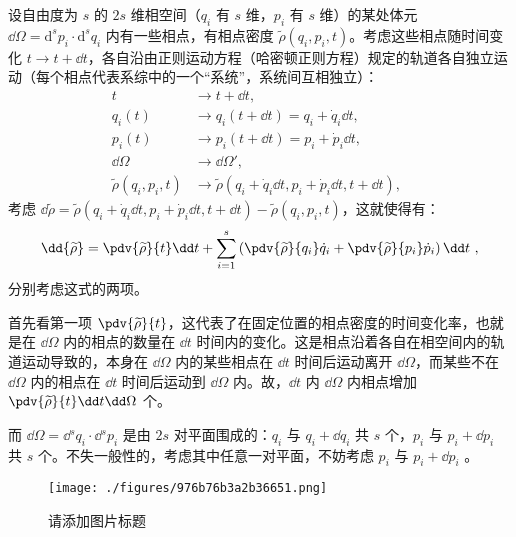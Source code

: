 设自由度为 $s$ 的 $2s$ 维相空间（$q_i$ 有 $s$ 维，$p_i$ 有 $s$ 维）的某处体元 $\dd \Omega = \mathrm{d}^{s}{p_i} \cdot  \mathrm{d}^{s}{q_i}$ 内有一些相点，有相点密度 $\widetilde \rho(q_i, p_i, t)$。考虑这些相点随时间变化 $t \rightarrow t + \dd t$，各自沿由正则运动方程（哈密顿正则方程）规定的轨道各自独立运动（每个相点代表系综中的一个“系统”，系统间互相独立）：
$$
\begin{aligned}
t                            &\rightarrow t+\dd t, \\
q_i(t)                       &\rightarrow q_i(t+\dd t) = q_i + \dot q_i \dd t, \\
p_i(t)                       &\rightarrow p_i(t+\dd t) = p_i + \dot p_i \dd t, \\
\dd \Omega                   &\rightarrow \dd \Omega', \\
\widetilde \rho(q_i, p_i, t) &\rightarrow \widetilde \rho(q_i + \dot q_i \dd t, p_i + \dot p_i \dd t, t + \dd t),
\end{aligned}~~
$$
考虑 $\dd{\widetilde{\rho}} = \widetilde{\rho}(q_i + \dot q_i \dd t, p_i + \dot p_i \dd t, t + \dd t) - \widetilde{\rho}(q_i, p_i, t)$，这就使得有：
\begin{equation}
\dd{\widetilde \rho} = \pdv{\widetilde \rho}{t} \dd t + \sum_{i=1}^{s}\left(\pdv{\widetilde \rho}{q_i}\dot q_i + \pdv{\widetilde \rho}{p_i}\dot p_i\right) \dd t  ~,
\end{equation}
分别考虑这式的两项。

首先看第一项 $\pdv{\widetilde \rho}{t}$，这代表了在固定位置的相点密度的时间变化率，也就是在 $\dd \Omega$ 内的相点的数量在 $\dd t$ 时间内的变化。这是相点沿着各自在相空间内的轨道运动导致的，本身在 $\dd \Omega$ 内的某些相点在 $\dd t$ 时间后运动离开 $\dd \Omega$，而某些不在 $\dd \Omega$ 内的相点在 $\dd t$ 时间后运动到 $\dd \Omega$ 内。故，$\dd t$ 内 $\dd \Omega$ 内相点增加 $\pdv{\widetilde \rho}{t} \dd t \dd \Omega$ 个。

而 $\dd \Omega = \dd{}^s q_i \cdot \dd{}^s p_i$ 是由 $2s$ 对平面围成的：$q_i$ 与 $q_i + \dd q_i$ 共 $s$ 个，$p_i$ 与 $p_i + \dd p_i$ 共 $s$ 个。不失一般性的，考虑其中任意一对平面，不妨考虑 $p_i$ 与 $p_i+\dd p_i$ 。

\begin{figure}[ht]
\centering
\texttt{[image: ./figures/976b76b3a2b36651.png]}
\caption{请添加图片标题} \label{fig_LiouTh_3}
\end{figure}
